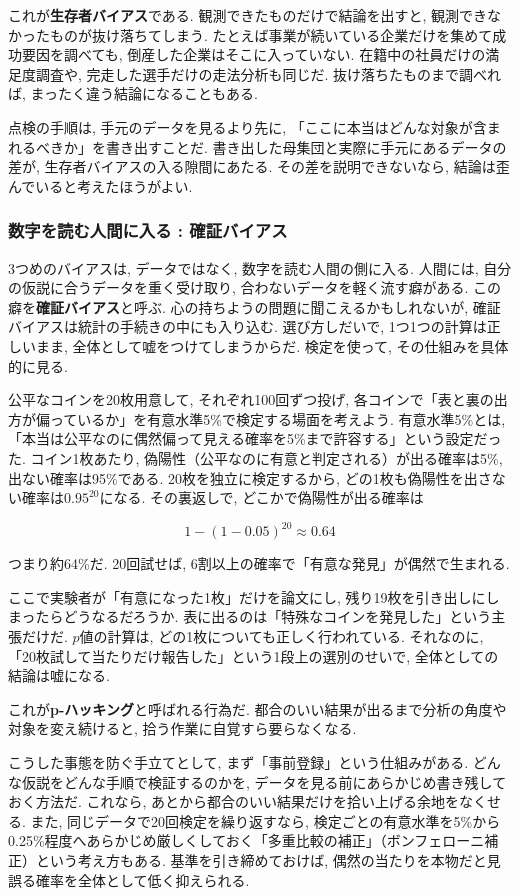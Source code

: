 これが\textbf{生存者バイアス}である.
観測できたものだけで結論を出すと, 観測できなかったものが抜け落ちてしまう.
たとえば事業が続いている企業だけを集めて成功要因を調べても, 倒産した企業はそこに入っていない.
在籍中の社員だけの満足度調査や, 完走した選手だけの走法分析も同じだ.
抜け落ちたものまで調べれば, まったく違う結論になることもある.

点検の手順は, 手元のデータを見るより先に, 「ここに本当はどんな対象が含まれるべきか」を書き出すことだ.
書き出した母集団と実際に手元にあるデータの差が, 生存者バイアスの入る隙間にあたる.
その差を説明できないなら, 結論は歪んでいると考えたほうがよい.

\subsubsection*{数字を読む人間に入る : 確証バイアス}

3つめのバイアスは, データではなく, 数字を読む人間の側に入る.
人間には, 自分の仮説に合うデータを重く受け取り, 合わないデータを軽く流す癖がある.
この癖を\textbf{確証バイアス}と呼ぶ.
心の持ちようの問題に聞こえるかもしれないが, 確証バイアスは統計の手続きの中にも入り込む.
選び方しだいで, 1つ1つの計算は正しいまま, 全体として嘘をつけてしまうからだ.
検定を使って, その仕組みを具体的に見る.

公平なコインを20枚用意して, それぞれ100回ずつ投げ, 各コインで「表と裏の出方が偏っているか」を有意水準5\%で検定する場面を考えよう.
有意水準5\%とは, 「本当は公平なのに偶然偏って見える確率を5\%まで許容する」という設定だった.
コイン1枚あたり, 偽陽性（公平なのに有意と判定される）が出る確率は5\%, 出ない確率は95\%である.
20枚を独立に検定するから, どの1枚も偽陽性を出さない確率は$0.95^{20}$になる. その裏返しで, どこかで偽陽性が出る確率は

$$
1 - (1 - 0.05)^{20} \approx 0.64
$$

つまり約64\%だ. 20回試せば, 6割以上の確率で「有意な発見」が偶然で生まれる.

ここで実験者が「有意になった1枚」だけを論文にし, 残り19枚を引き出しにしまったらどうなるだろうか.
表に出るのは「特殊なコインを発見した」という主張だけだ.
$p$値の計算は, どの1枚についても正しく行われている.
それなのに, 「20枚試して当たりだけ報告した」という1段上の選別のせいで, 全体としての結論は嘘になる.

これが\textbf{p-ハッキング}と呼ばれる行為だ.
都合のいい結果が出るまで分析の角度や対象を変え続けると, 拾う作業に自覚すら要らなくなる.

こうした事態を防ぐ手立てとして, まず「事前登録」という仕組みがある. どんな仮説をどんな手順で検証するのかを, データを見る前にあらかじめ書き残しておく方法だ. これなら, あとから都合のいい結果だけを拾い上げる余地をなくせる.
また, 同じデータで20回検定を繰り返すなら, 検定ごとの有意水準を5\%から0.25\%程度へあらかじめ厳しくしておく「多重比較の補正」（ボンフェローニ補正）という考え方もある. 基準を引き締めておけば, 偶然の当たりを本物だと見誤る確率を全体として低く抑えられる.


